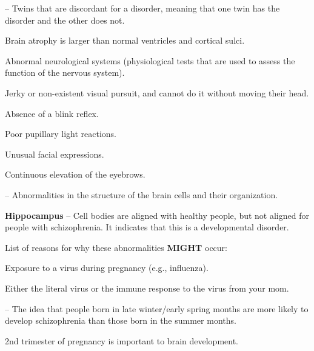 \begin{coloredlist}
    \item {} -- Twins that are discordant for a disorder, meaning that one twin has the disorder and the other does not. 
    \item Brain atrophy is larger than normal ventricles and cortical sulci.
    \item Abnormal neurological systems (physiological tests that are used to assess the function of the nervous system).
    \begin{coloredlist}
        \item Jerky or non-existent visual pursuit, and cannot do it without moving their head.
        \item Absence of a blink reflex.
        \item Poor pupillary light reactions.
        \item Unusual facial expressions.
        \item Continuous elevation of the eyebrows.
    \end{coloredlist}
    \item {} -- Abnormalities in the structure of the brain cells and their organization.
    \begin{coloredlist}
        \item \textbf{Hippocampus} -- Cell bodies are aligned with healthy people, but not aligned for people with schizophrenia. It indicates that this is a developmental disorder.
        \item List of reasons for why these abnormalities \textbf{MIGHT} occur:
        \begin{coloredlist}
            \item Exposure to a virus during pregnancy (e.g., influenza).
            \begin{coloredlist}
                \item Either the literal virus or the immune response to the virus from your mom.
                \item {} -- The idea that people born in late winter/early spring months are more likely to develop schizophrenia than those born in the summer months.
                \begin{coloredlist}
                    \item 2nd trimester of pregnancy is important to brain development.
                    \begin{coloredlist}

\end{coloredlist}
\end{coloredlist}
\end{coloredlist}
\end{coloredlist}
\end{coloredlist}
\end{coloredlist}
